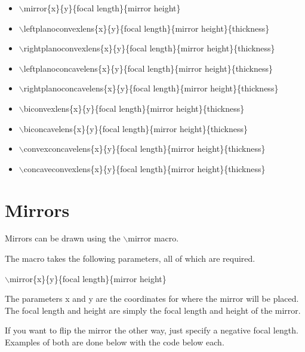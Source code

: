 \documentclass[12pt]{article}
\begin{document}
\begin{itemize}
\item $\backslash$mirror\{x\}\{y\}\{focal length\}\{mirror height\}
\item $\backslash$leftplanoconvexlens\{x\}\{y\}\{focal length\}\{mirror height\}\{thickness\}
\item $\backslash$rightplanoconvexlens\{x\}\{y\}\{focal length\}\{mirror height\}\{thickness\}
\item $\backslash$leftplanoconcavelens\{x\}\{y\}\{focal length\}\{mirror height\}\{thickness\}
\item $\backslash$rightplanoconcavelens\{x\}\{y\}\{focal length\}\{mirror height\}\{thickness\}
\item $\backslash$biconvexlens\{x\}\{y\}\{focal length\}\{mirror height\}\{thickness\}
\item $\backslash$biconcavelens\{x\}\{y\}\{focal length\}\{mirror height\}\{thickness\}
\item $\backslash$convexconcavelens\{x\}\{y\}\{focal length\}\{mirror height\}\{thickness\}
\item $\backslash$concaveconvexlens\{x\}\{y\}\{focal length\}\{mirror height\}\{thickness\}
\end{itemize}


\section{Mirrors}

Mirrors can be drawn using the $\backslash$mirror macro.

The macro takes the following parameters, all of which are required.

$\backslash$mirror\{x\}\{y\}\{focal length\}\{mirror height\}

The parameters x and y are the coordinates for where the mirror will be placed. The focal length and height are simply the focal length and height of the mirror.

If you want to flip the mirror the other way, just specify a negative focal length. Examples of both are done below with the code below each.
\end{document}
